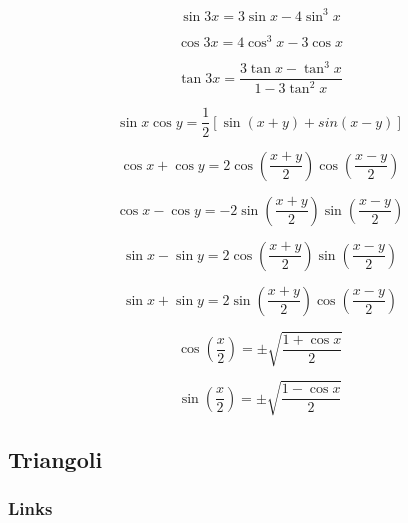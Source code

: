 \begin{equation}
\sin 3x=3\sin x - 4 \sin^3x
\end{equation}

\begin{equation}
\cos 3x=4\cos^3 x - 3 \cos x
\end{equation}

\begin{equation}
\tan 3x = \frac{
3\tan x - \tan^3x
}{
1-3\tan^2x
}
\end{equation}

\begin{equation}
\sin x \cos y = \frac{1}{2}[ \sin(x+y)+sin(x-y) ]
\end{equation}

\begin{equation}
\cos x + \cos y =2\cos \left(
\frac{x+y}{2}
\right)
\cos \left(
\frac{x-y}{2}
\right)
\end{equation}

\begin{equation}
\cos x - \cos y =-2\sin \left(
\frac{x+y}{2}
\right)
\sin \left(
\frac{x-y}{2}
\right)
\end{equation}


\begin{equation}
\sin x - \sin y =2\cos \left(
\frac{x+y}{2}
\right)
\sin \left(
\frac{x-y}{2}
\right)
\end{equation}

\begin{equation}
\sin x + \sin y =2\sin \left(
\frac{x+y}{2}
\right)
\cos \left(
\frac{x-y}{2}
\right)
\end{equation}

\begin{equation}
\cos\left( \frac{x}{2} \right) = \pm \sqrt{\frac{1+\cos x}{2}}
\end{equation}


\begin{equation}
\sin\left( \frac{x}{2} \right) = \pm \sqrt{\frac{1-\cos x}{2}}
\end{equation}

\setcounter{equation}{0}

\subsection{Triangoli}

\subsubsection{Links}

